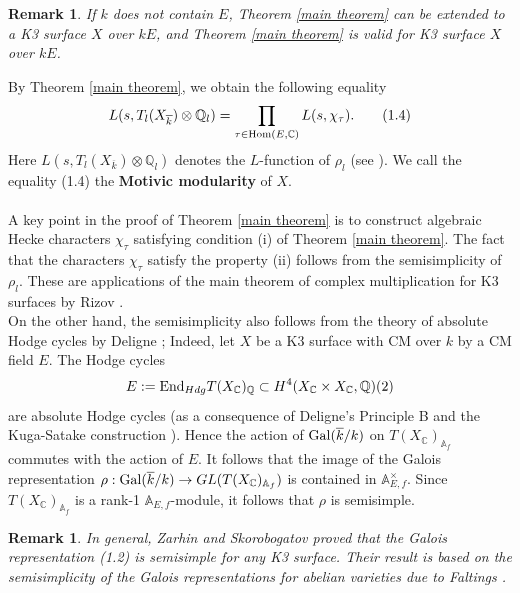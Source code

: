 \documentclass[reqno,a4paper,11pt]{amsart}
\newtheorem{rmk}[dfn]{Remark}
\theoremstyle{definition}
\theoremstyle{definition}
\begin{document}
       \begin{rmk}
           If $k$ does not contain $E$, Theorem \ref{main theorem} can be extended to a  K3 surface $X$  over  $kE$, and  Theorem \ref{main theorem} is  valid for   K3 surface $X$ over $kE$.
       \end{rmk}
    By Theorem \ref{main theorem}, we obtain the following equality 
   \begin{align}
       L(s, T_{l}(X_{\overline{k}})\otimes \mathbb{Q}_{l})=\prod_{\tau\in {\rm Hom}(E, \mathbb{C})}L(s, \chi_{\tau}). \tag{1.4}
   \end{align}
   Here $L(s, T_{l}(X_{\overline{k}})\otimes \mathbb{Q}_{l})$ denotes the $L$-function of $\rho_{l}$ (see \cite[Section 2]{tay}). We call the equality (1.4)  the \textbf{Motivic modularity}  of $X$.
   \\\\ \indent A key point in the proof of Theorem \ref{main theorem} is to construct algebraic Hecke characters $\chi_{\tau}$ satisfying  condition (i) of Theorem \ref{main theorem}. The fact that the characters $\chi_{\tau}$ satisfy the property (ii) follows from the semisimplicity of $\rho_{l}$. These are applications  of the main theorem of complex multiplication for K3 surfaces by Rizov \cite{Rizov10}. 
   \\\indent On the other hand, the semisimplicity also follows from the theory of absolute Hodge cycles by Deligne \cite{dmos};  Indeed, let $X$ be a K3 surface with CM over $k$ by a CM field $E$. The Hodge cycles 
   \begin{align}E:={\rm End}_{Hdg}T(X_{\mathbb{C}})_{\mathbb{Q}}\subset H^{4}(X_{\mathbb{C}}\times X_{\mathbb{C}}, \mathbb{Q})(2) \notag 
   \end{align}are absolute Hodge cycles (as a consequence of Deligne's Principle B \cite[I, Theorem 2.12]{dmos} and the Kuga-Satake construction \cite[Proposition 6.5]{del 1}). Hence the action of ${\rm Gal}(\overline{k}/k)$ on $T(X_{\mathbb{C}})_{\mathbb{A}_{f}}$ commutes with the action  of $E$. It follows that the image of the Galois representation $\rho:{\rm Gal}(\overline{k}/k)\to GL(T(X_{\mathbb{C}})_{\mathbb{A}_{f}})$ is contained in  $\mathbb{A}^{\times}_{E, f}$. Since $T(X_{\mathbb{C}})_{\mathbb{A}_{f}}$ is a rank-1 $\mathbb{A}_{E, f}$-module, it follows that $\rho$ is semisimple. 
   \begin{rmk}
       In general, Zarhin and Skorobogatov \cite{sz} proved that the Galois representation (1.2) is semisimple for any K3 surface. Their result is based on the semisimplicity of the Galois representations for abelian varieties due to Faltings \cite{fal}. 
       \end{rmk}
\end{document}
